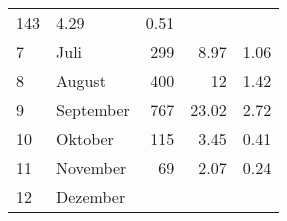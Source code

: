 \begin{longtable}{lXrrr}
       \num{143} &
       \num[round-mode=places,round-precision=2]{4.29} &
         \num[round-mode=places,round-precision=2]{0.51} \\

     7 &
     \multicolumn{1}{X}{ Juli   } &


       \num{299} &
       \num[round-mode=places,round-precision=2]{8.97} &
         \num[round-mode=places,round-precision=2]{1.06} \\

     8 &
     \multicolumn{1}{X}{ August   } &


       \num{400} &
       \num[round-mode=places,round-precision=2]{12} &
         \num[round-mode=places,round-precision=2]{1.42} \\

     9 &
     \multicolumn{1}{X}{ September   } &


       \num{767} &
       \num[round-mode=places,round-precision=2]{23.02} &
         \num[round-mode=places,round-precision=2]{2.72} \\

     10 &
     \multicolumn{1}{X}{ Oktober   } &


       \num{115} &
       \num[round-mode=places,round-precision=2]{3.45} &
         \num[round-mode=places,round-precision=2]{0.41} \\

     11 &
     \multicolumn{1}{X}{ November   } &


       \num{69} &
       \num[round-mode=places,round-precision=2]{2.07} &
         \num[round-mode=places,round-precision=2]{0.24} \\

     12 &
     \multicolumn{1}{X}{ Dezember   } &



\end{longtable}
